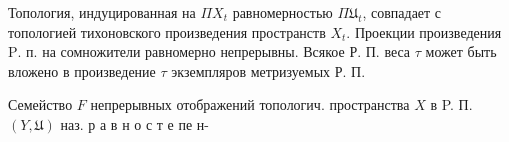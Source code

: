 \documentclass[10pt]{article}
\begin{document}
Топология, индуцированная на $\Pi X_{t}$ равномерностью $\Pi \mathfrak{U}_{t}$, совпадает с топологией тихоновского произведения пространств $X_{t}$. Проекции произведения $\mathrm{P}$. п. на сомножители равномерно непрерывны. Всякое Р. П. веса $\tau$ может быть вложено в произведение $\tau$ экземпляров метризуемых Р. П.



Семейство $F$ непрерывных отображений топологич. пространства $X$ в P. П. $(Y, \mathfrak{U})$ наз. р а в н о с т е пе н-
\end{document}
